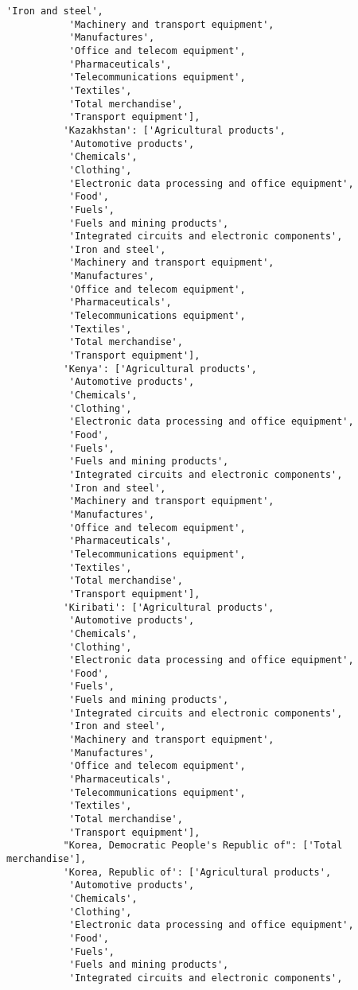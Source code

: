 \documentclass[11pt]{article}
\begin{document}
\begin{Verbatim}[commandchars=\\\{\}]
           'Iron and steel',
           'Machinery and transport equipment',
           'Manufactures',
           'Office and telecom equipment',
           'Pharmaceuticals',
           'Telecommunications equipment',
           'Textiles',
           'Total merchandise',
           'Transport equipment'],
          'Kazakhstan': ['Agricultural products',
           'Automotive products',
           'Chemicals',
           'Clothing',
           'Electronic data processing and office equipment',
           'Food',
           'Fuels',
           'Fuels and mining products',
           'Integrated circuits and electronic components',
           'Iron and steel',
           'Machinery and transport equipment',
           'Manufactures',
           'Office and telecom equipment',
           'Pharmaceuticals',
           'Telecommunications equipment',
           'Textiles',
           'Total merchandise',
           'Transport equipment'],
          'Kenya': ['Agricultural products',
           'Automotive products',
           'Chemicals',
           'Clothing',
           'Electronic data processing and office equipment',
           'Food',
           'Fuels',
           'Fuels and mining products',
           'Integrated circuits and electronic components',
           'Iron and steel',
           'Machinery and transport equipment',
           'Manufactures',
           'Office and telecom equipment',
           'Pharmaceuticals',
           'Telecommunications equipment',
           'Textiles',
           'Total merchandise',
           'Transport equipment'],
          'Kiribati': ['Agricultural products',
           'Automotive products',
           'Chemicals',
           'Clothing',
           'Electronic data processing and office equipment',
           'Food',
           'Fuels',
           'Fuels and mining products',
           'Integrated circuits and electronic components',
           'Iron and steel',
           'Machinery and transport equipment',
           'Manufactures',
           'Office and telecom equipment',
           'Pharmaceuticals',
           'Telecommunications equipment',
           'Textiles',
           'Total merchandise',
           'Transport equipment'],
          "Korea, Democratic People's Republic of": ['Total merchandise'],
          'Korea, Republic of': ['Agricultural products',
           'Automotive products',
           'Chemicals',
           'Clothing',
           'Electronic data processing and office equipment',
           'Food',
           'Fuels',
           'Fuels and mining products',
           'Integrated circuits and electronic components',

\end{Verbatim}
\end{document}

